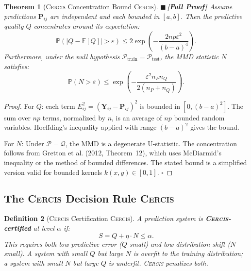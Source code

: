 \documentclass[12pt,a4paper]{article}
\newtheorem{theorem}{Theorem}[section]
\newtheorem{definition}[theorem]{Definition}
\theoremstyle{definition}
\newcommand{\rigorFull}{{\color{rigorcolor}$\blacksquare$\,\textbf{[Full Proof]}}}
\newcommand{\Cercis}{\textsc{Cercis}}
\newcommand{\E}{\mathbb{E}}
\newcommand{\Pbb}{\mathbb{P}}
\newcommand{\cP}{\mathcal{P}}
\newcommand{\cQ}{\mathcal{Q}}
\newcommand{\abs}[1]{\left|#1\right|}
\newcommand{\mat}[1]{\mathbf{#1}}
\begin{document}
\begin{theorem}[\Cercis{} Concentration Bound \Cercis{}]\label{thm:cercis_concentration}
\rigorFull
Assume predictions $\mat{P}_{ij}$ are independent and each bounded in $[a, b]$.
Then the predictive quality $Q$ concentrates around its expectation:
\begin{equation}\label{eq:cercis_Q_bound}
    \Pbb\left(\abs{Q - \E[Q]} > \varepsilon\right) \leq 2\exp\!\left(-\frac{2 n p \varepsilon^2}{(b-a)^4}\right).
\end{equation}
Furthermore, under the null hypothesis $\cP_{\text{train}} = \cP_{\text{test}}$, 
the MMD statistic $N$ satisfies:
\begin{equation}\label{eq:cercis_N_bound}
    \Pbb\left(N > \varepsilon\right) \leq \exp\!\left(-\frac{\varepsilon^2 n_P n_Q}{2(n_P + n_Q)}\right).
\end{equation}
\end{theorem}

\begin{proof}
For $Q$: each term $E_{ij}^2 = (\mat{Y}_{ij} - \mat{P}_{ij})^2$ is bounded in $[0, (b-a)^2]$.
The sum over $np$ terms, normalized by $n$, is an average of $np$ bounded random variables.
Hoeffding's inequality applied with range $(b-a)^2$ gives the bound.

For $N$: Under $\cP = \cQ$, the MMD is a degenerate U-statistic. The concentration 
follows from Gretton et al. (2012, Theorem~12), which uses McDiarmid's inequality or 
the method of bounded differences. The stated bound is a simplified version valid for 
bounded kernels $k(x,y) \in [0,1]$. \hfill $\square$
\end{proof}

\subsection{The \Cercis{} Decision Rule \Cercis{}}

\begin{definition}[\Cercis{} Certification \Cercis{}]\label{def:cercis_certification}
A prediction system is \textbf{\Cercis{}-certified} at level $\alpha$ if:
\begin{equation}\label{eq:cercis_certified}
    S = Q + \eta \cdot N \leq \alpha.
\end{equation}
This requires both low predictive error ($Q$ small) and low distribution shift ($N$ small).
A system with small $Q$ but large $N$ is overfit to the training distribution; a system 
with small $N$ but large $Q$ is underfit. \Cercis{} penalizes both.
\end{definition}
\end{document}
